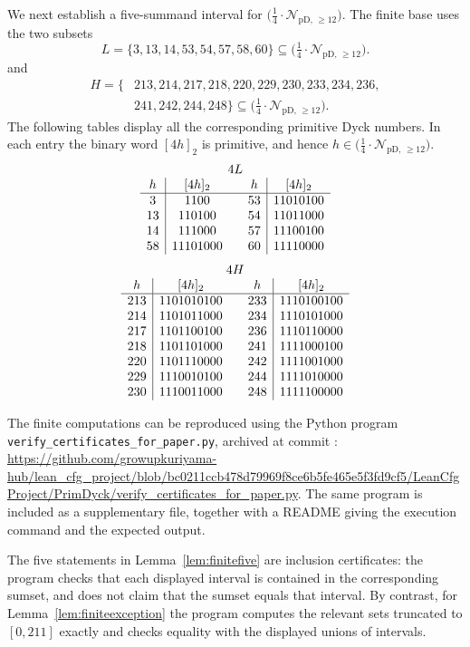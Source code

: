 \documentclass[12pt]{article}
\theoremstyle{plain}
\newcommand{\Pset}{\bigl(\tfrac14\cdot
  \mathcal{N}_{\mathrm{pD},\,\geq12}\bigr)}
\begin{document}
We next establish a five-summand interval for $\Pset$.  The finite base
uses the two subsets
\begin{equation}\label{eq:L-def}
 L=\{3,13,14,53,54,57,58,60\}\subseteq\Pset.
\end{equation}
and
\begin{equation}\label{eq:H-def}
\begin{split}
 H=\{&213,214,217,218,220,229,230,233,234,236,\\
     &241,242,244,248\}\subseteq\Pset.
\end{split}
\end{equation}
The following tables display all the corresponding primitive Dyck
numbers.  In each entry the binary word $[4h]_2$ is primitive, and hence
$h\in\Pset$.
\[
\begin{array}{c|c@{\qquad}c|c}
\multicolumn{4}{c}{4L}\\
h&[4h]_2&h&[4h]_2\\ \hline
3&1100&53&11010100\\
13&110100&54&11011000\\
14&111000&57&11100100\\
58&11101000&60&11110000
\end{array}
\]
\[
\begin{array}{c|c@{\qquad}c|c}
\multicolumn{4}{c}{4H}\\
h&[4h]_2&h&[4h]_2\\ \hline
213&1101010100&233&1110100100\\
214&1101011000&234&1110101000\\
217&1101100100&236&1110110000\\
218&1101101000&241&1111000100\\
220&1101110000&242&1111001000\\
229&1110010100&244&1111010000\\
230&1110011000&248&1111100000
\end{array}
\]

The finite computations can be reproduced using the Python program
\texttt{verify\_certificates\_for\_paper.py}, archived at commit
:
\url{https://github.com/growupkuriyama-hub/lean_cfg_project/blob/bc0211ccb478d79969f8ce6b5fe465e5f3fd9cf5/LeanCfgProject/PrimDyck/verify_certificates_for_paper.py}.
The same program is included as a supplementary file, together with a
README giving the execution command and the expected output.

The five statements in Lemma~\ref{lem:finitefive} are inclusion
certificates: the program checks that each displayed interval is
contained in the corresponding sumset, and does not claim that the
sumset equals that interval.  By contrast, for
Lemma~\ref{lem:finiteexception} the program computes the relevant sets
truncated to $[0,211]$ exactly and checks equality with the displayed
unions of intervals.
\end{document}
